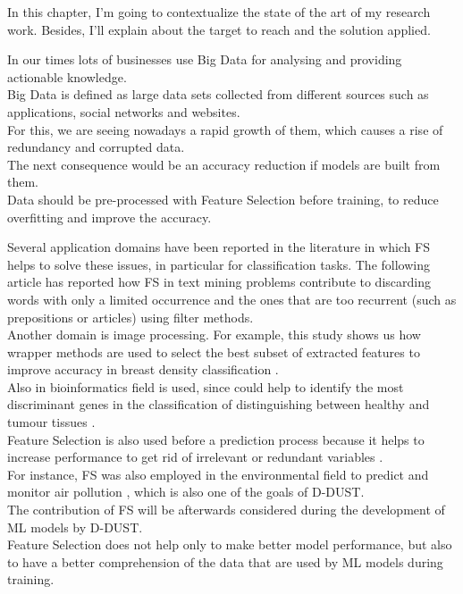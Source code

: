 In this chapter, I'm going to contextualize the state of the art of my research work. 
Besides, I'll explain about the target to reach and the solution applied.\par
In our times lots of businesses use Big Data for analysing and providing actionable knowledge.\\
Big Data is defined as large data sets collected from different sources such as applications, social networks and websites.\\
For this, we are seeing nowadays a rapid growth of them, which causes a rise of redundancy and corrupted data.\\
The next consequence would be an accuracy reduction if models are built from them.\\
Data should be pre-processed with Feature Selection before training, to reduce overfitting and improve the accuracy.\par
Several application domains have been reported in the literature in which FS helps to solve these issues, in particular for classification tasks.
The following article \cite{forman2003extensive} has reported how FS in text mining problems contribute to discarding words with only a limited occurrence and the ones that are too recurrent (such as prepositions or articles) using filter methods.\\
Another domain is image processing. For example, this study shows us how wrapper methods are used to select the best subset of extracted features to improve accuracy in breast density classification \cite{muvstra2012breast}.\\
Also in bioinformatics field is used, since could help to identify the most discriminant genes in the classification of distinguishing between healthy and tumour tissues \cite{dessi2013comparative}.\\
Feature Selection is also used before a prediction process because it helps to increase performance to get rid of irrelevant or redundant variables \cite{bagherzadeh2016tutorial}.\\  
For instance, FS was also employed in the environmental field to predict and monitor air pollution \cite{ul2022improving}, which is also one of the goals of D-DUST. \\
The contribution of FS will be afterwards considered during the development of ML models by D-DUST.\\
Feature Selection does not help only to make better model performance, but also to have a better comprehension of the data that are used by ML models during training.\\ 
